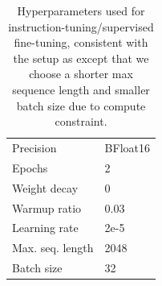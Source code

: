 \begin{table}[t!]
  \centering
  \small

    \caption{Hyperparameters used for instruction-tuning/supervised fine-tuning, consistent with the setup as \cite{ivison2023camels} except that we choose a shorter max sequence length and smaller batch size due to compute constraint.}
    \label{tab:training_hyper_parameters}
  
  \begin{tabular}{l | l}
    \toprule

Precision & BFloat16 \\
Epochs & 2 \\
Weight decay & 0 \\
Warmup ratio & 0.03 \\
Learning rate & 2e-5 \\
Max. seq. length & 2048 \\
Batch size & 32 \\
\bottomrule
  \end{tabular}

\end{table}
